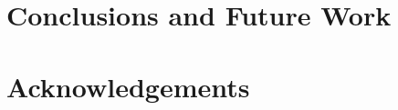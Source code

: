 \documentclass{llncs}
\begin{document}
\section{Conclusions and Future Work}
\label{sec:conclusionsAndFutureWork}





\section*{Acknowledgements}






\end{document}
